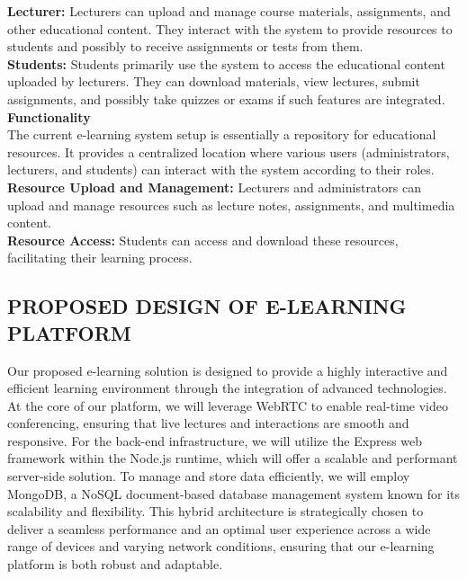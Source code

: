 \documentclass[a4paper,12pt]{article}  %
\begin{document}
\textbf{Lecturer: }Lecturers can upload and manage course materials, assignments, and
other educational content. They interact with the system to provide resources
to students and possibly to receive assignments or tests from them.\\

\textbf{Students: }Students primarily use the system to access the educational content
uploaded by lecturers. They can download materials, view lectures, submit
assignments, and possibly take quizzes or exams if such features are
integrated.\\

\large\textbf{Functionality}\\
The current e-learning system setup is essentially a repository for educational
resources. It provides a centralized location where various users
(administrators, lecturers, and students) can interact with the system
according to their roles.\\

\textbf{Resource Upload and Management:} Lecturers and administrators can upload and
manage resources such as lecture notes, assignments, and multimedia content.\\
\textbf{Resource Access:} Students can access and download these resources, facilitating
their learning process.\\

\subsection{PROPOSED DESIGN OF E-LEARNING PLATFORM}
Our proposed e-learning solution is designed to provide a highly interactive
and efficient learning environment through the integration of advanced
technologies. At the core of our platform, we will leverage WebRTC to enable
real-time video conferencing, ensuring that live lectures and interactions are
smooth and responsive. For the back-end infrastructure, we will utilize the
Express web framework within the Node.js runtime, which will offer a scalable
and performant server-side solution. To manage and store data efficiently, we
will employ MongoDB, a NoSQL document-based database management system known
for its scalability and flexibility. This hybrid architecture is strategically
chosen to deliver a seamless performance and an optimal user experience across
a wide range of devices and varying network conditions, ensuring that our
e-learning platform is both robust and adaptable.\\
\end{document}
